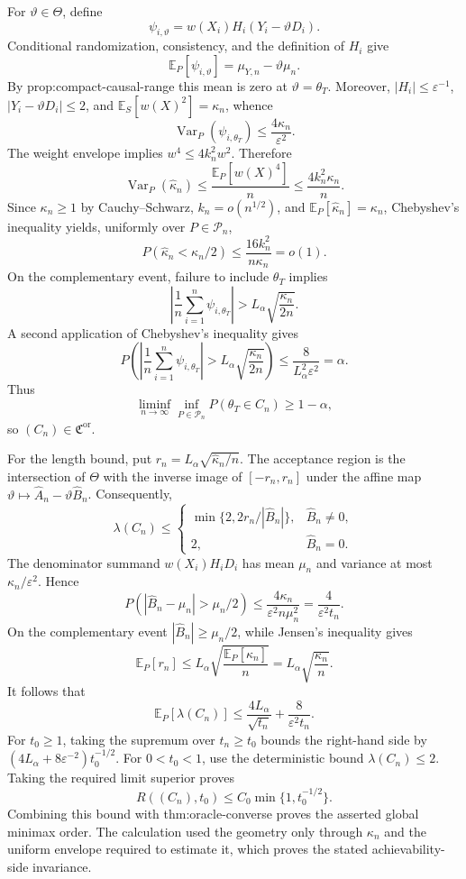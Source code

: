 For \(\vartheta\in\Theta\), define
\[
 \psi_{i,\vartheta}=w(X_i)H_i(Y_i-\vartheta D_i).
\]
Conditional randomization, consistency, and the definition of \(H_i\) give
\[
 \mathbb E_P[\psi_{i,\vartheta}]=\mu_{Y,n}-\vartheta\mu_n.
\]
By prop:compact-causal-range this mean is zero at \(\vartheta=\theta_T\).  Moreover, \(|H_i|\le\varepsilon^{-1}\), \(|Y_i-\vartheta D_i|\le2\), and \(\mathbb E_S[w(X)^2]=\kappa_n\), whence
\[
 \operatorname{Var}_P(\psi_{i,\theta_T})\le\frac{4\kappa_n}{\varepsilon^2}.
\]
The weight envelope implies \(w^4\le4k_n^2w^2\).  Therefore
\[
 \operatorname{Var}_P(\widehat\kappa_n)
 \le\frac{\mathbb E_P[w(X)^4]}{n}
 \le\frac{4k_n^2\kappa_n}{n}.
\]
Since \(\kappa_n\ge1\) by Cauchy--Schwarz, \(k_n=o(n^{1/2})\), and \(\mathbb E_P[\widehat\kappa_n]=\kappa_n\), Chebyshev's inequality yields, uniformly over \(P\in\mathcal P_n\),
\[
 P(\widehat\kappa_n<\kappa_n/2)
 \le\frac{16k_n^2}{n\kappa_n}=o(1).
\]
On the complementary event, failure to include \(\theta_T\) implies
\[
 \left|\frac1n\sum_{i=1}^n\psi_{i,\theta_T}\right|
 >L_\alpha\sqrt{\frac{\kappa_n}{2n}}.
\]
A second application of Chebyshev's inequality gives
\[
 P\left(\left|\frac1n\sum_{i=1}^n\psi_{i,\theta_T}\right|
 >L_\alpha\sqrt{\frac{\kappa_n}{2n}}\right)
 \le\frac{8}{L_\alpha^2\varepsilon^2}=\alpha.
\]
Thus
\[
 \liminf_{n\to\infty}\inf_{P\in\mathcal P_n}
 P(\theta_T\in C_n)\ge1-\alpha,
\]
so \((C_n)\in\mathfrak C^{\mathrm{or}}\).

For the length bound, put \(r_n=L_\alpha\sqrt{\widehat\kappa_n/n}\).  The acceptance region is the intersection of \(\Theta\) with the inverse image of \([-r_n,r_n]\) under the affine map \(\vartheta\mapsto\widehat A_n-\vartheta\widehat B_n\).  Consequently,
\[
 \lambda(C_n)\le
 \begin{cases}
 \min\{2,2r_n/|\widehat B_n|\},&\widehat B_n\ne0,\\
 2,&\widehat B_n=0.
 \end{cases}
\]
The denominator summand \(w(X_i)H_iD_i\) has mean \(\mu_n\) and variance at most \(\kappa_n/\varepsilon^2\).  Hence
\[
 P(|\widehat B_n-\mu_n|>\mu_n/2)
 \le\frac{4\kappa_n}{\varepsilon^2n\mu_n^2}
 =\frac{4}{\varepsilon^2t_n}.
\]
On the complementary event \(|\widehat B_n|\ge\mu_n/2\), while Jensen's inequality gives
\[
 \mathbb E_P[r_n]
 \le L_\alpha\sqrt{\frac{\mathbb E_P[\widehat\kappa_n]}n}
 =L_\alpha\sqrt{\frac{\kappa_n}{n}}.
\]
It follows that
\[
 \mathbb E_P[\lambda(C_n)]
 \le\frac{4L_\alpha}{\sqrt{t_n}}+
 \frac{8}{\varepsilon^2t_n}.
\]
For \(t_0\ge1\), taking the supremum over \(t_n\ge t_0\) bounds the right-hand side by \((4L_\alpha+8\varepsilon^{-2})t_0^{-1/2}\).  For \(0<t_0<1\), use the deterministic bound \(\lambda(C_n)\le2\).  Taking the required limit superior proves
\[
 R((C_n),t_0)\le C_0\min\{1,t_0^{-1/2}\}.
\]
Combining this bound with thm:oracle-converse proves the asserted global minimax order.  The calculation used the geometry only through \(\kappa_n\) and the uniform envelope required to estimate it, which proves the stated achievability-side invariance.